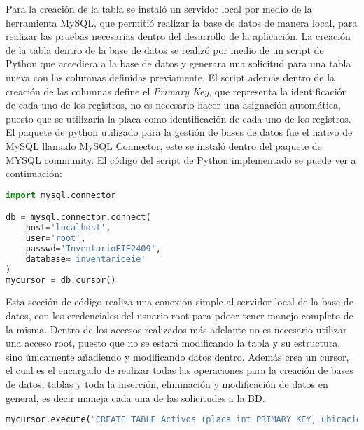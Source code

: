 \par
Para la creación de la tabla se instaló un servidor local por medio de la herramienta MySQL, que permitió realizar la base de datos de manera local, para realizar las pruebas necesarias dentro del desarrollo de la aplicación. La creación de la tabla dentro de la base de datos se realizó por medio de un script de Python que accediera a la base de datos y generara una solicitud para una tabla nueva con las columnas definidas previamente. El script además dentro de la creación de las columnas define el \textit{Primary Key}, que representa la identificación de cada uno de los registros, no es necesario hacer una asignación automática, puesto que se utilizaría la placa como identificación de cada uno de los registros. El paquete de python utilizado para la gestión de bases de datos fue el nativo de MySQL llamado MySQL Connector, este se instaló dentro del paquete de MYSQL community. El código del script de Python implementado se puede ver a continuación:
\newpage
\begin{lstlisting}[language=Python,frame=single,caption= Script de python para la conexión a una base de datos (creación propia), inputencoding=latin1]
import mysql.connector

db = mysql.connector.connect(
    host='localhost',
    user='root',
    passwd='InventarioEIE2409',
    database='inventarioeie'
)
mycursor = db.cursor()
\end{lstlisting}
\par
Esta sección de código realiza una conexión simple al servidor local de la base de datos, con los credenciales del usuario root para pdoer tener manejo completo de la misma. Dentro de los accesos realizados más adelante no es necesario utilizar una acceso root, puesto que no se estará modificando la tabla y su estructura, sino únicamente añadiendo y modificando datos dentro. Además crea un cursor, el cual es el encargado de realizar todas las operaciones para la creación de bases de datos, tablas y toda la inserción, eliminación y modificación de datos en general, es decir maneja cada una de las solicitudes a la BD. 
\begin{lstlisting}[language=Python,frame=single,caption= Script de python para la creación de una tabla en una base de datos (creación propia), inputencoding=latin1]
mycursor.execute("CREATE TABLE Activos (placa int PRIMARY KEY, ubicacion TEXT(65535), tipo_de_activo TEXT(65535), descripcion TEXT(65535))")
\end{lstlisting}
\par
